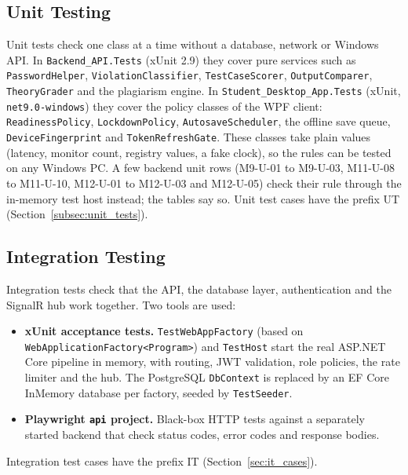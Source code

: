\subsection{Unit Testing}
\begin{sloppypar}
Unit tests check one class at a time without a database, network or Windows API. In \texttt{Backend\_\allowbreak{}API.\allowbreak{}Tests} (xUnit 2.9) they cover pure services such as \texttt{PasswordHelper}, \texttt{ViolationClassifier}, \texttt{TestCaseScorer}, \texttt{OutputComparer}, \texttt{TheoryGrader} and the plagiarism engine. In \texttt{Student\_\allowbreak{}Desktop\_\allowbreak{}App.\allowbreak{}Tests} (xUnit, \texttt{net9.0-\allowbreak{}windows}) they cover the policy classes of the WPF client: \texttt{ReadinessPolicy}, \texttt{LockdownPolicy}, \texttt{AutosaveScheduler}, the offline save queue, \texttt{DeviceFingerprint} and \texttt{TokenRefreshGate}. These classes take plain values (latency, monitor count, registry values, a fake clock), so the rules can be tested on any Windows PC. A few backend unit rows (M9-U-01 to M9-U-03, M11-U-08 to M11-U-10, M12-U-01 to M12-U-03 and M12-U-05) check their rule through the in-memory test host instead; the tables say so. Unit test cases have the prefix UT (Section~\ref{subsec:unit_tests}).
\end{sloppypar}

\subsection{Integration Testing}
\begin{sloppypar}
Integration tests check that the API, the database layer, authentication and the SignalR hub work together. Two tools are used:
\begin{itemize}[nosep]
  \item \textbf{xUnit acceptance tests.} \texttt{TestWebAppFactory} (based on \texttt{WebApplication\allowbreak{}Factory<Program>}) and \texttt{TestHost} start the real ASP.NET Core pipeline in memory, with routing, JWT validation, role policies, the rate limiter and the hub. The PostgreSQL \texttt{DbContext} is replaced by an EF Core InMemory database per factory, seeded by \texttt{TestSeeder}.
  \item \textbf{Playwright \texttt{api} project.} Black-box HTTP tests against a separately started backend that check status codes, error codes and response bodies.
\end{itemize}
Integration test cases have the prefix IT (Section~\ref{sec:it_cases}).
\end{sloppypar}

